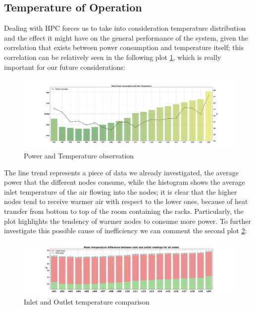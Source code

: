 \subsection{Temperature of Operation}
Dealing with HPC forces us to take into consideration temperature distribution and the effect it might have on the general performance of the system, given the correlation that exists between power consumption and temperature itself; this correlation can be relatively seen in the following plot \ref{fig:PWR_TEMP}, which is really important for our future considerations:

\begin{figure}[H]
    \centering
    \includegraphics[width=1\textwidth]{Figures/PWR_TEMPin_nodes_mean_plot.png}
    \caption{Power and Temperature observation}
    \label{fig:PWR_TEMP}
\end{figure}

The line trend represents a piece of data we already investigated, the average power that the different nodes consume, while the histogram shows the average inlet temperature of the air flowing into the nodes;
it is clear that the higher nodes tend to receive warmer air with respect to the lower ones, because of heat transfer from bottom to top of the room containing the racks.
Particularly, the plot highlights the tendency of warmer nodes to consume more power.
To further investigate this possible cause of inefficiency we can comment the second plot \ref{fig:TEMP}:

\begin{figure}[H]
    \centering
    \includegraphics[width=1\textwidth]{Figures/TEMP_difference_plot.png}
    \caption{Inlet and Outlet temperature comparison}
    \label{fig:TEMP}
\end{figure}

